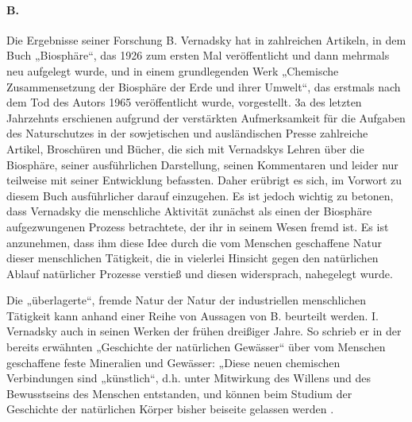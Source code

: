 \documentclass[11pt,a4paper]{article}
\begin{document}
\paragraph{B.} 
Die Ergebnisse seiner Forschung B. Vernadsky hat in zahlreichen Artikeln, in
dem Buch „Biosphäre“, das 1926 zum ersten Mal veröffentlicht und dann mehrmals
neu aufgelegt wurde, und in einem grundlegenden Werk „Chemische
Zusammensetzung der Biosphäre der Erde und ihrer Umwelt“, das erstmals nach
dem Tod des Autors 1965 veröffentlicht wurde, vorgestellt. 3a des letzten
Jahrzehnts erschienen aufgrund der verstärkten Aufmerksamkeit für die Aufgaben
des Naturschutzes in der sowjetischen und ausländischen Presse zahlreiche
Artikel, Broschüren und Bücher, die sich mit Vernadskys Lehren über die
Biosphäre, seiner ausführlichen Darstellung, seinen Kommentaren und leider nur
teilweise mit seiner Entwicklung befassten. Daher erübrigt es sich, im Vorwort
zu diesem Buch ausführlicher darauf einzugehen. Es ist jedoch wichtig zu
betonen, dass Vernadsky die menschliche Aktivität zunächst als einen der
Biosphäre aufgezwungenen Prozess betrachtete, der ihr in seinem Wesen fremd
ist. Es ist anzunehmen, dass ihm diese Idee durch die vom Menschen geschaffene
Natur dieser menschlichen Tätigkeit, die in vielerlei Hinsicht gegen den
natürlichen Ablauf natürlicher Prozesse verstieß und diesen widersprach,
nahegelegt wurde.

Die „überlagerte“, fremde Natur der Natur der industriellen menschlichen
Tätigkeit kann anhand einer Reihe von Aussagen von B. beurteilt werden.
I. Vernadsky auch in seinen Werken der frühen dreißiger Jahre. So schrieb er
in der bereits erwähnten „Geschichte der natürlichen Gewässer“ über vom
Menschen geschaffene feste Mineralien und Gewässer: „Diese neuen chemischen
Verbindungen sind „künstlich“, d.h. unter Mitwirkung des Willens und des
Bewusstseins des Menschen entstanden, und können beim Studium der Geschichte
der natürlichen Körper bisher beiseite gelassen werden
\cite[S. 87]{Vernadsky1960}.
\end{document}
